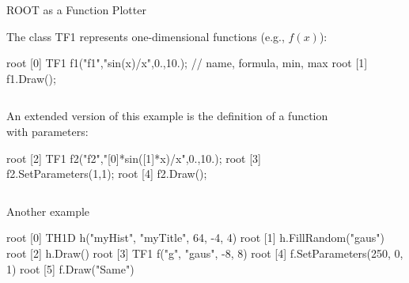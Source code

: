 \documentclass[aspectratio=169]{beamer}
\newcommand{\myfigure}[2]{
    \begin{figure}
        \makebox[\textwidth]{%
            \texttt{[image: \#2]}
        }
    \end{figure}
}
\begin{document}
\begin{frame}[fragile]{ROOT as a Function Plotter}

    The class TF1 represents one-dimensional functions (e.g., $f(x)$):

    \begin{myterminal}
root [0] TF1 f1("f1","sin(x)/x",0.,10.); // name, formula, min, max
root [1] f1.Draw();
    \end{myterminal}

    \begin{columns}
        \begin{column}{0.7\textwidth}

            An extended version of this example is the definition of a function
            with parameters:

            \begin{myterminal}
root [2] TF1 f2("f2","[0]*sin([1]*x)/x",0.,10.);
root [3] f2.SetParameters(1,1);
root [4] f2.Draw();
            \end{myterminal}
        \end{column}

        \begin{column}{0.3\textwidth}
            \myfigure{1.2}{figure-002.pdf}
        \end{column}
    \end{columns}

\end{frame}

\begin{frame}[fragile]{Another example}
    \begin{myterminal}
root [0] TH1D h("myHist", "myTitle", 64, -4, 4)
root [1] h.FillRandom("gaus")
root [2] h.Draw()
root [3] TF1 f("g", "gaus", -8, 8)
root [4] f.SetParameters(250, 0, 1)
root [5] f.Draw("Same")
    \end{myterminal}

    \myfigure{0.45}{figure-003.pdf}
\end{frame}
\end{document}
